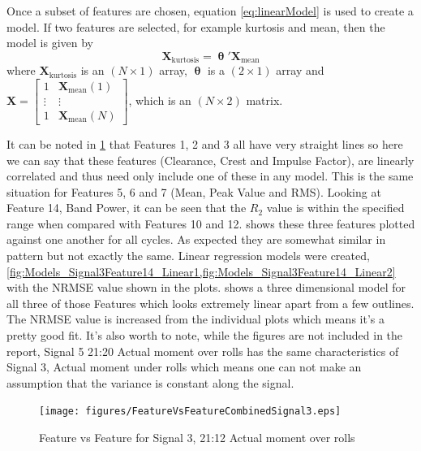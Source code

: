 \documentclass[]{article}
\begin{document}
Once a subset of features are chosen, equation \ref{eq:linearModel} is used to create a model. If two features are selected, for example kurtosis and mean, then the model is given by
\begin{equation}
\mathbf{X}_{\textrm{kurtosis}} = \boldsymbol{\uptheta}'\mathbf{X}_{\textrm{mean}}
\end{equation}
where $\mathbf{X}_{\textrm{kurtosis}}$ is an $(N\times1)$ array, $\boldsymbol{\uptheta}$ is a $(2\times1)$ array and $\mathbf{X} = \begin{bmatrix} 1 & \mathbf{X}_{\textrm{mean}}(1) \\ \vdots & \vdots \\ 1 & \mathbf{X}_{\textrm{mean}}(N) \end{bmatrix}$, which is an $(N\times2)$ matrix. 

It can be noted in \cref{fig:FeatureVsFeatureCombinedSignal3} that Features 1, 2 and 3 all have very straight lines so here we can say that these features (Clearance, Crest and Impulse Factor), are linearly correlated and thus need only include one of these in any model. This is the same situation for Features 5, 6 and 7 (Mean, Peak Value and RMS).
Looking at Feature 14, Band Power, it can be seen that the $R_2$ value is within the specified range when compared with Features 10 and 12.  shows these three features plotted against one another for all cycles. As expected they are somewhat similar in pattern but not exactly the same. Linear regression models were created, \cref{fig:Models_Signal3Feature14_Linear1,fig:Models_Signal3Feature14_Linear2} with the \gls{NRMSE} value shown in the plots.  shows a three dimensional model for all three of those Features which looks extremely linear apart from a few outlines. The \gls{NRMSE} value is increased from the individual plots which means it's a pretty good fit. It's also worth to note, while the figures are not included in the report, Signal 5 21:20 Actual moment over rolls has the same characteristics of Signal 3, Actual moment under rolls which means one can not make an assumption that the variance is constant along the signal.

\begin{figure}[H]
    \centering
    \texttt{[image: figures/FeatureVsFeatureCombinedSignal3.eps]}
    \caption{Feature vs Feature for Signal 3, 21:12 Actual moment over rolls}
    \label{fig:FeatureVsFeatureCombinedSignal3}
\end{figure}
\end{document}
